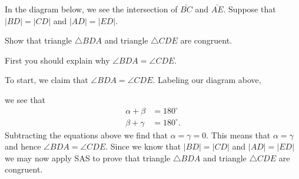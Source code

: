 \documentclass[nooutcomes,noauthor,hints,handout]{ximera}
\begin{document}
\begin{question}
  In the diagram below, we see the intersection of $\bar{BC}$ and
  $\bar{AE}$. Suppose that $\left\vert BD\right\vert =\left\vert
  CD\right\vert $ and $\left\vert AD\right\vert =\left\vert
  ED\right\vert $.
  \begin{center}
  \end{center}
  Show that triangle $\triangle BDA$ and triangle $\triangle CDE$ are
  congruent.
  
  \begin{hint}
    First you should explain why $\angle BDA = \angle CDE$.
  \end{hint}
  \begin{freeResponse}
    To start, we claim that $\angle BDA = \angle CDE$. Labeling our
    diagram above,
    \begin{center}
    \end{center}
    we see that 
    \begin{align*}
      \alpha+\beta &= 180^\circ\\
      \beta + \gamma &= 180^\circ.
\end{align*}
Subtracting the equations above we find that $\alpha=\gamma = 0$.
This means that $\alpha = \gamma$ and hence $\angle BDA = \angle
CDE$. Since we know that $\left\vert BD\right\vert =\left\vert
CD\right\vert $ and $\left\vert AD\right\vert =\left\vert
ED\right\vert $ we may now apply SAS to prove that triangle $\triangle
BDA$ and triangle $\triangle CDE$ are congruent.
\end{freeResponse}
\end{question}
\end{document}
